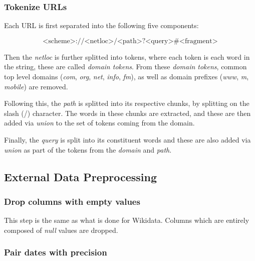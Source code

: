 \documentclass[epsfig,a4paper,11pt,titlepage,twoside,openany]{book}
\begin{document}
\subsubsection{Tokenize URLs}
\label{sec:data-preprocessiong-wik-URL-tokenization}

Each URL is first separated into the following five components:

$$
\text{<scheme>://<netloc>/<path>?<query>\#<fragment>}
$$

Then the \textit{netloc} is further splitted into tokens, where each token is each word in the string, these are called \textit{domain tokens}. From these \textit{domain tokens}, common top level domains (\textit{com}, \textit{org}, \textit{net}, \textit{info}, \textit{fm}), as well as domain prefixes (\textit{www}, \textit{m}, \textit{mobile}) are removed. 

Following this, the \textit{path} is splitted into its respective chunks, by splitting on the slash (/) character. The words in these chunks are extracted, and these are then added via \textit{union} to the set of tokens coming from the domain. 

Finally, the \textit{query} is split into its constituent words and these are also added via \textit{union} as part of the tokens from the \textit{domain} and \textit{path}. 




\subsection{External Data Preprocessing}
\label{sec:data-preprocessing-external}

\subsubsection{Drop columns with empty values}
\label{sec:data-preprocessiong-ext-drop-empty}

This step is the same as what is done for Wikidata. Columns which are entirely composed of \textit{null} values are dropped.

\subsubsection{Pair dates with precision}
\label{sec:data-preprocessiong-ext-date-precision}
\end{document}
